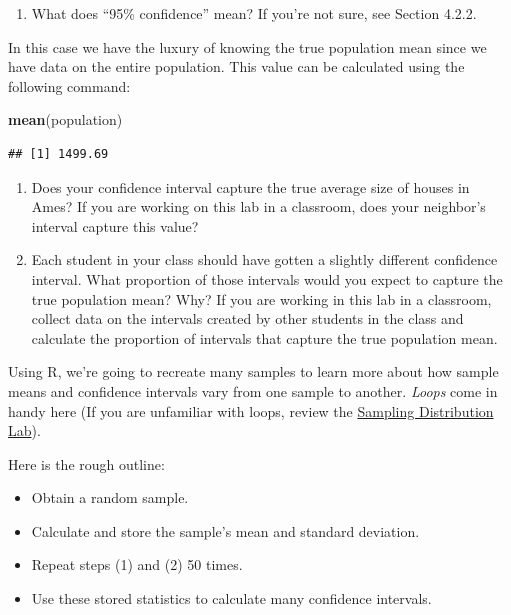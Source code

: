 \documentclass[]{book}
\newenvironment{Shaded}{\begin{snugshade}}{\end{snugshade}}
\newcommand{\KeywordTok}[1]{\textcolor[rgb]{0.13,0.29,0.53}{\textbf{{#1}}}}
\newcommand{\NormalTok}[1]{{#1}}
\providecommand{\tightlist}{%
  \setlength{\itemsep}{0pt}\setlength{\parskip}{0pt}}
\theoremstyle{definition}
\theoremstyle{definition}
\theoremstyle{remark}
\begin{document}
\begin{enumerate}
\def\labelenumi{\arabic{enumi}.}
\setcounter{enumi}{3}
\tightlist
\item
  What does ``95\% confidence'' mean? If you're not sure, see Section
  4.2.2.
\end{enumerate}

In this case we have the luxury of knowing the true population mean
since we have data on the entire population. This value can be
calculated using the following command:

\begin{Shaded}
\begin{Highlighting}[]
\KeywordTok{mean}\NormalTok{(population)}
\end{Highlighting}
\end{Shaded}

\begin{verbatim}
## [1] 1499.69
\end{verbatim}

\begin{enumerate}
\def\labelenumi{\arabic{enumi}.}
\setcounter{enumi}{4}
\item
  Does your confidence interval capture the true average size of houses
  in Ames? If you are working on this lab in a classroom, does your
  neighbor's interval capture this value?
\item
  Each student in your class should have gotten a slightly different
  confidence interval. What proportion of those intervals would you
  expect to capture the true population mean? Why? If you are working in
  this lab in a classroom, collect data on the intervals created by
  other students in the class and calculate the proportion of intervals
  that capture the true population mean.
\end{enumerate}

Using R, we're going to recreate many samples to learn more about how
sample means and confidence intervals vary from one sample to another.
\emph{Loops} come in handy here (If you are unfamiliar with loops,
review the
\href{http://htmlpreview.github.io/?https://github.com/andrewpbray/oiLabs/blob/master/sampling_distributions/sampling_distributions.html}{Sampling
Distribution Lab}).

Here is the rough outline:

\begin{itemize}
\tightlist
\item
  Obtain a random sample.
\item
  Calculate and store the sample's mean and standard deviation.
\item
  Repeat steps (1) and (2) 50 times.
\item
  Use these stored statistics to calculate many confidence intervals.
\end{itemize}
\end{document}
